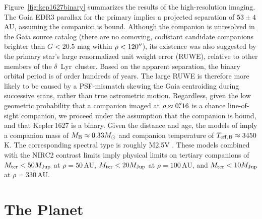 \documentclass[12pt,modern,twocolumn,tighten]{aastex63}
\newcommand{\cn}{$\delta$\ Lyr\ cluster} %
\begin{document}
Figure~\ref{fig:kep1627binary} summarizes the results of the
high-resolution imaging.  The Gaia EDR3 parallax for the primary
implies a projected separation of $53 \pm 4$\,AU, assuming the
companion is bound.  Although the companion is unresolved in the Gaia
source catalog (there are no comoving, codistant candidate companions
brighter than $G < 20.5$ mag within $\rho < 120\mbox{$^{\prime\prime}$}$), its
existence was also suggested by the primary star's large renormalized
unit weight error (RUWE), relative to other members of the \cn.  Based
on the apparent separation, the binary orbital period is of order
hundreds of years.  The large RUWE is therefore more likely to be
caused by a PSF-mismatch skewing the Gaia centroiding during
successive scans, rather than true astrometric motion.  Regardless,
given the low geometric probability that a companion imaged at $\rho
\approx 0\mbox{$.\!\!^{\prime\prime}$}16$ is a chance line-of-sight companion, we proceed
under the assumption that the companion is bound, and that
Kepler\,1627 is a binary.  Given the distance and age, the models of
\citet{baraffe_new_2015} imply a companion mass of $M_{\rm B} \approx
0.33 M_{\odot}$ and companion temperature of $T_{\rm eff,B} \approx
3450$ K.  The corresponding spectral type is roughly M2.5V
\citep{pecaut_mamajek_2013}.  These models combined with the NIRC2
contrast limits imply physical limits on tertiary companions of
$M_{\rm ter} < 50 M_{\rm Jup}$ at $\rho = 50$\,AU, $M_{\rm ter} < 20
M_{\rm Jup}$ at $\rho = 100$\,AU, and $M_{\rm ter} < 10 M_{\rm Jup}$
at $\rho = 330$\,AU.



\section{The Planet}
\label{sec:planet}
\end{document}
